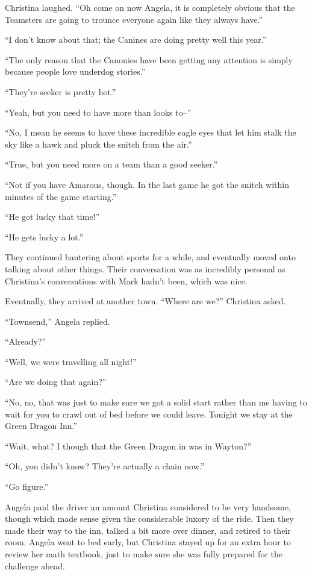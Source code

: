 \documentclass[showtrims,b6paper,draft,10pt]{memoir}
\begin{document}
Christina laughed.  ``Oh come on now Angela, it is completely obvious that the Teamsters are going to trounce everyone again like they always have.''

``I don't know about that;  the Canines are doing pretty well this year.''

``The only reason that the Canonies have been getting any attention is simply because people love underdog stories.''

``They're seeker is pretty hot.''

``Yeah, but you need to have more than looks to--''

``No, I mean he seems to have these incredible eagle eyes that let him stalk the sky like a hawk and pluck the snitch from the air.''

``True, but you need more on a team than a good seeker.''

``Not if you have Amarous, though.  In the last game he got the snitch within minutes of the game starting.''

``He got lucky that time!''

``He gets lucky a lot.''

They continued bantering about sports for a while, and eventually moved onto talking about other things.  Their conversation was as incredibly personal as Christina's conversations with Mark hadn't been, which was nice.

Eventually, they arrived at another town.  ``Where are we?''  Christina asked.

``Townsend,'' Angela replied.

``Already?''

``Well, we were travelling all night!''

``Are we doing that again?''

``No, no, that was just to make sure we got a solid start rather than me having to wait for you to crawl out of bed before we could leave.  Tonight we stay at the Green Dragon Inn.''

``Wait, what?  I though that the Green Dragon in was in Wayton?''

``Oh, you didn't know?  They're actually a chain now.''

``Go figure.''

Angela paid the driver an amount Christina considered to be very handsome, though which made sense given the considerable luxory of the ride.  Then they made their way to the inn, talked a bit more over dinner, and retired to their room.  Angela went to bed early, but Christina stayed up for an extra hour to review her math textbook, just to make sure she was fully prepared for the challenge ahead.

\timeskip

\appendix{}
\end{document}
